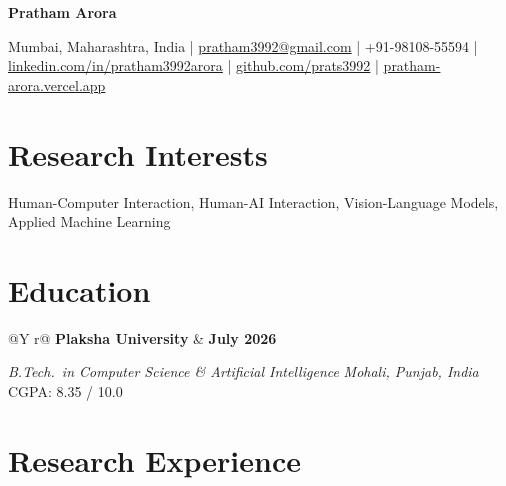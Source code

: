 \documentclass[11pt,letterpaper]{article}
\makeatletter
\newcommand{\cvheaderline}[2]{%
    \begin{tabularx}{\linewidth}{@{}Y r@{}}
        \textbf{#1} & \textbf{\footnotesize #2}
    \end{tabularx}%
}
\makeatother
\begin{document}
 
\begin{center}
    {\Huge \textbf{Pratham Arora}}
    \vspace{0.5ex}
 
    {\small
    Mumbai, Maharashtra, India \quad|\quad
    \href{mailto:pratham3992@gmail.com}{pratham3992@gmail.com} \quad|\quad
    +91-98108-55594 \quad|\quad
    \href{https://linkedin.com/in/pratham3992arora}{linkedin.com/in/pratham3992arora} \quad|\quad
    \href{https://github.com/prats3992}{github.com/prats3992} \quad|\quad
    \href{https://pratham-arora.vercel.app}{pratham-arora.vercel.app}
    }
\end{center}
 
\vspace{-1ex}
 
\section*{Research Interests}
\vspace{-0.5ex}
Human-Computer Interaction, Human-AI Interaction, Vision-Language Models, Applied Machine Learning
 
\vspace{0.3ex}
 
\section*{Education}
\vspace{-0.5ex}
 
\cvheaderline{Plaksha University}{July 2026}
{\footnotesize \textit{B.Tech.\ in Computer Science \& Artificial Intelligence} \hfill \textit{Mohali, Punjab, India}}\\[0.15ex]
{\footnotesize CGPA: 8.35 / 10.0}
 
\section*{Research Experience}
\vspace{-0.5ex}
 
\end{document}
